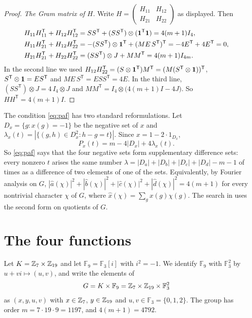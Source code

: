 \documentclass[11pt,colorlinks]{charlie}
\newcommand{\F}{\mathbb{F}}
\newcommand{\T}{\mathsf T}
\begin{document}
\begin{proof}
\emph{The Gram matrix of $H$.} Write $H=\begin{pmatrix}H_{11}&H_{12}\\H_{21}&H_{22}\end{pmatrix}$ as displayed. Then
\begin{align*}
H_{11}H_{11}^{\T}+H_{12}H_{12}^{\T}&=SS^{\T}+(SS^{\T})\otimes(\one^{\T}\one)=4(m+1)I_4,\\
H_{11}H_{21}^{\T}+H_{12}H_{22}^{\T}&=-(SS^{\T})\otimes\one^{\T}+(ME\,S^{\T})^{\T}=-4E^{\T}+4E^{\T}=0,\\
H_{21}H_{21}^{\T}+H_{22}H_{22}^{\T}&=(SS^{\T})\otimes J+MM^{\T}=4(m+1)I_{4m}.
\end{align*}
In the second line we used $H_{12}H_{22}^{\T}=(S\otimes\one^{\T})M^{\T}=(M(S^{\T}\otimes\one))^{\T}$, $S^{\T}\otimes\one=ES^{\T}$ and $ME\,S^{\T}=ESS^{\T}=4E$. In the third line, $(SS^{\T})\otimes J=4\,I_4\otimes J$ and $MM^{\T}=I_4\otimes\bigl(4(m+1)I-4J\bigr)$. So $HH^{\T}=4(m+1)I$.
\end{proof}

The condition \eqref{eq:paf} has two standard reformulations. Let $D_x=\{g:x(g)=-1\}$ be the negative set of $x$ and $\lambda_x(t)=|\{(g,h)\in D_x^2:h-g=t\}|$. Since $x=1-2\cdot1_{D_x}$,
\begin{equation}\label{eq:differences}
P_x(t)=m-4|D_x|+4\lambda_x(t).
\end{equation}
So \eqref{eq:paf} says that the four negative sets form supplementary difference sets: every nonzero $t$ arises the same number $\lambda=|D_a|+|D_b|+|D_c|+|D_d|-m-1$ of times as a difference of two elements of one of the sets. Equivalently, by Fourier analysis on $G$, $|\hat a(\chi)|^2+|\hat b(\chi)|^2+|\hat c(\chi)|^2+|\hat d(\chi)|^2=4(m+1)$ for every nontrivial character $\chi$ of $G$, where $\hat x(\chi)=\sum_gx(g)\chi(g)$. The search in  uses the second form on quotients of $G$.

\section{The four functions}\label{sec:functions}

Let $K=\mathbb{Z}_7\times\mathbb{Z}_{19}$ and let $\F_9=\F_3[i]$ with $i^2=-1$. We identify $\F_9$ with $\F_3^2$ by $u+vi\mapsto(u,v)$, and write the elements of
\[
G=K\times\F_9=\Z_7\times\Z_{19}\times\F_3^2
\]
as $(x,y,u,v)$ with $x\in\mathbb{Z}_7$, $y\in\mathbb{Z}_{19}$ and $u,v\in\F_3=\{0,1,2\}$. The group has order $m=7\cdot19\cdot9=1197$, and $4(m+1)=4792$.
\end{document}
